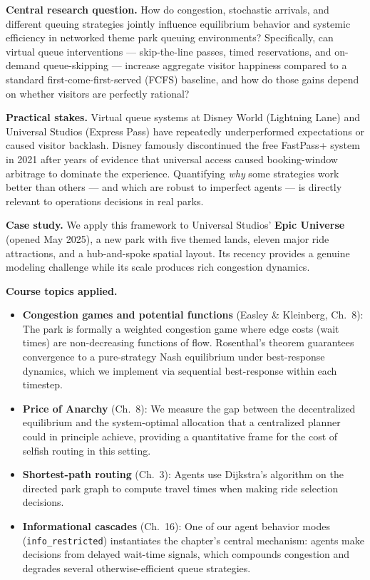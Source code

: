 \documentclass[11pt]{article}
\begin{document}
\textbf{Central research question.} How do congestion, stochastic arrivals, and different queuing strategies jointly influence equilibrium behavior and systemic efficiency in networked theme park queuing environments? Specifically, can virtual queue interventions --- skip-the-line passes, timed reservations, and on-demand queue-skipping --- increase aggregate visitor happiness compared to a standard first-come-first-served (FCFS) baseline, and how do those gains depend on whether visitors are perfectly rational?

\textbf{Practical stakes.} Virtual queue systems at Disney World (Lightning Lane) and Universal Studios (Express Pass) have repeatedly underperformed expectations or caused visitor backlash. Disney famously discontinued the free FastPass+ system in 2021 after years of evidence that universal access caused booking-window arbitrage to dominate the experience. Quantifying \emph{why} some strategies work better than others --- and which are robust to imperfect agents --- is directly relevant to operations decisions in real parks.

\textbf{Case study.} We apply this framework to Universal Studios' \textbf{Epic Universe} (opened May 2025), a new park with five themed lands, eleven major ride attractions, and a hub-and-spoke spatial layout. Its recency provides a genuine modeling challenge while its scale produces rich congestion dynamics.

\textbf{Course topics applied.}
\begin{itemize}[nosep]
    \item \textbf{Congestion games and potential functions} (Easley \& Kleinberg, Ch.~8): The park is formally a weighted congestion game where edge costs (wait times) are non-decreasing functions of flow. Rosenthal's theorem guarantees convergence to a pure-strategy Nash equilibrium under best-response dynamics, which we implement via sequential best-response within each timestep.
    \item \textbf{Price of Anarchy} (Ch.~8): We measure the gap between the decentralized equilibrium and the system-optimal allocation that a centralized planner could in principle achieve, providing a quantitative frame for the cost of selfish routing in this setting.
    \item \textbf{Shortest-path routing} (Ch.~3): Agents use Dijkstra's algorithm on the directed park graph to compute travel times when making ride selection decisions.
    \item \textbf{Informational cascades} (Ch.~16): One of our agent behavior modes (\texttt{info\_restricted}) instantiates the chapter's central mechanism: agents make decisions from delayed wait-time signals, which compounds congestion and degrades several otherwise-efficient queue strategies.
\end{itemize}
\end{document}
